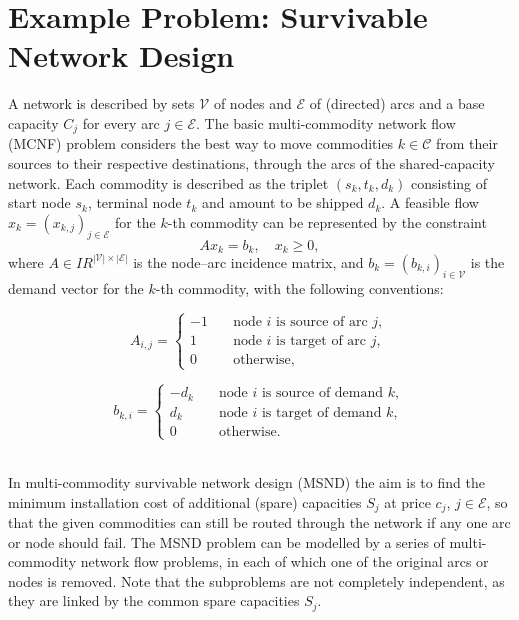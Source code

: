 \documentclass[10pt,a4paper]{book}
\newcommand{\R}{\mbox{$I\!\!R$}}
\begin{document}
\section{Example Problem: Survivable Network Design}
A network is described by sets $\mathcal{V}$ of nodes and
$\mathcal{E}$ of (directed) arcs and a base capacity $C_j$
for every arc $j\in\mathcal{E}$. The basic multi-commodity network flow
(MCNF) problem considers the best way to move commodities
$k\in\mathcal{C}$ from their sources to their respective destinations, through
the arcs of the shared-capacity network. Each commodity is described as the
triplet $(s_k, t_k, d_k)$ consisting of start node $s_k$, terminal
node $t_k$ and amount to be shipped $d_k$. A feasible flow 
$x_k = (x_{k,j})_{j\in\mathcal{E}}$ for the $k$-th commodity can be
represented by the constraint
$$
A x_k = b_k, \quad x_k\ge 0,
$$
where $A\in\R^{|\mathcal{V}|\times|\mathcal{E}|}$ is the node--arc
incidence matrix, and $b_k = (b_{k,i})_{i\in\mathcal{V}}$ is the demand vector
for the $k$-th commodity, with the following conventions:\\
\parbox{8cm}{
$$
A_{i,j} = \left\{\begin{array}{rl}
 -1 \quad & \text{node $i$ is source of arc $j$},\\
  1 \quad & \text{node $i$ is target of arc $j$,}\\
  0 \quad & \text{otherwise},
\end{array}\right.
$$
}
\parbox{8cm}{
$$
b_{k,i} = \left\{\begin{array}{rl}
 -d_k \quad & \text{node $i$ is source of demand $k$},\\
  d_k \quad & \text{node $i$ is target of demand $k$},\\
  0 \quad & \text{otherwise}.
\end{array}\right.
$$
}\\
In multi-commodity survivable network design (MSND) the aim is to 
find the minimum installation cost of additional (spare) capacities
$S_j$ at price $c_j$, $j\in\mathcal{E}$, so that the given commodities
can still be routed through the network if any one arc or node should fail.
The MSND problem can be modelled by a series of multi-commodity network flow
problems, in each of which one of the original arcs or nodes is removed.
Note that the subproblems are not completely independent, as they
are linked by the common spare capacities $S_j$.
\end{document}
